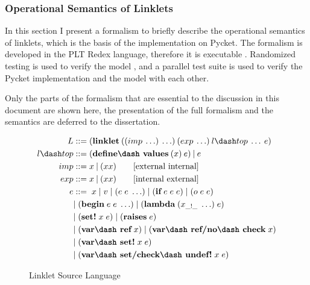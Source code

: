 \newpage

\subsubsection{Operational Semantics of Linklets}
\label{subsec:linklets-semantics}

In this section I present a formalism to briefly describe the
operational semantics of linklets, which is the basis of the
implementation on Pycket. The formalism is developed in the PLT Redex
language, therefore it is executable
\cite{felleisen2009semantics}. Randomized testing is used to verify
the model \cite{random-test:2009}, and a parallel test suite is used
to verify the Pycket implementation and the model with each other.

Only the parts of the formalism that are essential to the discussion
in this document are shown here, the presentation of the full
formalism and the semantics are deferred to the
dissertation.

\begin{wrapfigure}[14]{r}{0.45\textwidth}
  \vspace{-0.7cm}
  \footnotesize
  \begin{mdframed}
    \begin{align*}
      L  &::= (\textbf{linklet}\:((imp\: \ldots)\: \ldots)\:(exp\: \ldots)\:l\dash top\:\ldots\:e)\\
      l\dash top &::= (\textbf{define\dash values}\:(x)\:e)\:|\:e \\
      imp &::= x\:|\:(x x) \tag*{[external internal]}\\
      exp &::= x\:|\:(x x) \tag*{[internal external]} \\
      e &::=\; x\; |\; v\; |\; (e\; e\; \ldots)\; |\; (\textbf{if}\; e\; e\; e)\; |\; (o\; e\; e)\; \\
      \; &|\; (\textbf{begin}\; e\; e\; \ldots)\; |\; (\textbf{lambda}\; (x_{\_!\_}\; \ldots)\; e)\\
      \; &|\; (\textbf{set!}\; x\; e)\; |\; (\textbf{raises}\; e)\\
      \; &|\; (\textbf{var\dash ref}\; x)\; |\; (\textbf{var\dash ref/no\dash check}\; x) \\
      \; &|\; (\textbf{var\dash set!}\; x\; e)  \\
      \; &|\; (\textbf{var\dash set/check\dash undef!}\; x\; e)
    \end{align*}
  \caption[hede]{Linklet Source Language \footnotemark}
  \label{fig:linklet-source}
  \end{mdframed}
\end{wrapfigure}

